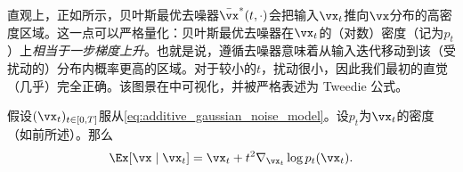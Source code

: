 \documentclass[../../book-main_zh.tex]{subfiles}
\begin{document}
直观上，正如所示，贝叶斯最优去噪器\(\bar{\vx}^{\ast}(t, \cdot)\)会把输入\(\vx_{t}\)推向\(\vx\)分布的高密度区域。这一点可以严格量化：贝叶斯最优去噪器在\(\vx_{t}\)的（对数）密度（记为\(p_{t}\)）上\textit{相当于一步梯度上升}。也就是说，遵循去噪器意味着从输入迭代移动到该（受扰动的）分布内概率更高的区域。对于较小的\(t\)，扰动很小，因此我们最初的直觉（几乎）完全正确。该图景在中可视化，并被严格表述为 Tweedie 公式\cite{Robbins1956AnEB}。
\begin{theorem}[Tweedie 公式]\label{thm:tweedie}
    假设\((\vx_{t})_{t \in [0, T]}\)服从\eqref{eq:additive_gaussian_noise_model}。设\(p_{t}\)为\(\vx_{t}\)的密度（如前所述）。那么
    \begin{equation}\label{eq:tweedie}
        \Ex[\vx \mid \vx_{t}] = \vx_{t} + t^{2}\nabla_{\vx_{t}} \log
        p_{t}(\vx_{t}).
    \end{equation}
\end{theorem}
\end{document}
